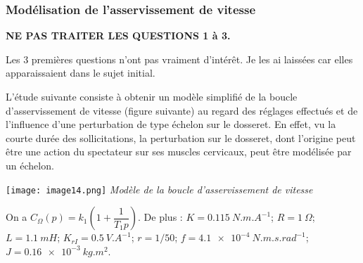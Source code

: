 \begin{multicols}{2}
%
%
%
%
%
%
%
%


\subsubsection*{Modélisation de l'asservissement de vitesse}

\textbf{NE PAS TRAITER LES QUESTIONS 1 à 3.}
\ifprof
\else

\begin{rem}
Les 3 premières questions n'ont pas vraiment d'intérêt. Je les ai laissées car elles apparaissaient dans le sujet initial.
\end{rem}

L'étude suivante consiste à obtenir un modèle simplifié de la boucle
d'asservissement de vitesse (figure suivante) au regard des réglages effectués
et de l'influence d'une perturbation de type échelon sur le dosseret. En
effet, vu la courte durée des sollicitations, la perturbation sur le
dosseret, dont l'origine peut être une action du spectateur sur ses
muscles cervicaux, peut être modélisée par un échelon.

\begin{center}
\texttt{[image: image14.png]}
\textit{Modèle de la boucle d'asservissement de vitesse \label{fig13}}
\end{center}

 On a \(C_{\Omega}\left( p \right) = k_{1}\left( 1 + \dfrac{1}{T_{1}p} \right)\). De plus : 
$K = \SI{0,115}{N.m.A^{-1}}$;
$R = \SI{1}{\Omega}$;
$L = \SI{1,1}{mH}$;
$K_{rI}= \SI{0,5}{V. A^{-1}}$;
$r = 1/50$;
$f = \SI{4.1e-4}{N.m.s.rad^{-1}}$;
$J=\SI{0,16e-3}{kg.m^{2}}$.


\end{multicols}
